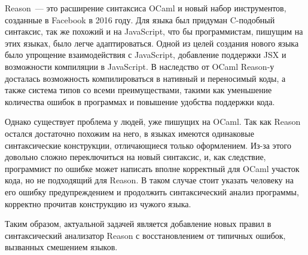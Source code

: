 Reason~--- это расширение синтаксиса OCaml и новый набор инструментов, созданные в Facebook в 2016 году. Для языка был придуман C-подобный синтаксис, так же похожий и на JavaScript, что бы программистам, пишущим на этих языках, было легче адаптироваться\cite{RE}. Одной из целей создания нового языка было упрощение взаимодействия с JavaScript, добавление поддержки JSX и возможности компиляции в JavaScript\cite{WE}. В наследство от OCaml Reason-у досталась возможность компилироваться в нативный и переносимый коды, а также система типов со всеми преимуществами, такими как уменьшение количества ошибок в программах и повышение удобства поддержки кода.

Однако существует проблема у людей, уже пишущих на OCaml. Так как Reason остался достаточно похожим на него, в языках имеются одинаковые синтаксические конструкции, отличающиеся только оформлением. Из-за этого довольно сложно переключиться на новый синтаксис, и, как следствие, программист по ошибке может написать вполне корректный для OCaml участок кода, но не подходящий для Reason. В таком случае стоит указать человеку на его ошибку предупреждением и продолжить синтаксический анализ программы, корректно прочитав конструкцию из чужого языка.

Таким образом, актуальной задачей является добавление новых правил в синтаксический анализатор Reason с восстановлением от типичных ошибок, вызванных смешением языков.